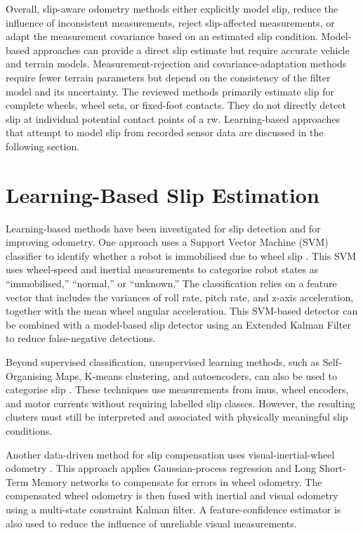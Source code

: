 \documentclass[report.tex]{subfiles}
\begin{document}
    Overall, slip-aware odometry methods either explicitly model slip, reduce the influence of inconsistent measurements, reject slip-affected measurements, or adapt the measurement covariance based on an estimated slip condition. Model-based approaches can provide a direct slip estimate but require accurate vehicle and terrain models. Measurement-rejection and covariance-adaptation methods require fewer terrain parameters but depend on the consistency of the filter model and its uncertainty. The reviewed methods primarily estimate slip for complete wheels, wheel sets, or fixed-foot contacts. They do not directly detect slip at individual potential contact points of a \gls{rw}. Learning-based approaches that attempt to model slip from recorded sensor data are discussed in the following section.

    \section{Learning-Based Slip Estimation}
    \label{sec:sota_learning_slip}

    Learning-based methods have been investigated for slip detection and for improving odometry. One approach uses a Support Vector Machine (SVM) classifier to identify whether a robot is immobilised due to wheel slip \cite{ward_classification2007}. This SVM uses wheel-speed and inertial measurements to categorise robot states as ``immobilised,'' ``normal,'' or ``unknown.'' The classification relies on a feature vector that includes the variances of roll rate, pitch rate, and z-axis acceleration, together with the mean wheel angular acceleration. This SVM-based detector can be combined with a model-based slip detector using an Extended Kalman Filter to reduce false-negative detections.

    Beyond supervised classification, unsupervised learning methods, such as Self-Organising Maps, K-means clustering, and autoencoders, can also be used to categorise slip \cite{Kruger2019}. These techniques use measurements from \glspl{imu}, wheel encoders, and motor currents without requiring labelled slip classes. However, the resulting clusters must still be interpreted and associated with physically meaningful slip conditions.

    Another data-driven method for slip compensation uses visual-inertial-wheel odometry \cite{Reginald2025}. This approach applies Gaussian-process regression and Long Short-Term Memory networks to compensate for errors in wheel odometry. The compensated wheel odometry is then fused with inertial and visual odometry using a multi-state constraint Kalman filter. A feature-confidence estimator is also used to reduce the influence of unreliable visual measurements.
\end{document}
